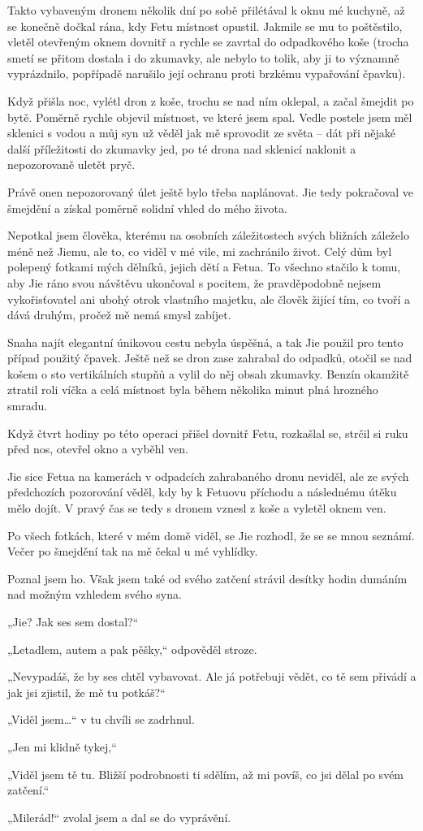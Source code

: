 Takto vybaveným dronem několik dní po sobě přilétával k oknu mé kuchyně, až se konečně dočkal rána, kdy Fetu místnost opustil. Jakmile se mu to poštěstilo, vletěl otevřeným oknem dovnitř a rychle se zavrtal do odpadkového koše (trocha smetí se přitom dostala i do zkumavky, ale nebylo to tolik, aby ji to významně vyprázdnilo, popřípadě narušilo její ochranu proti brzkému vypařování čpavku).

Když přišla noc, vylétl dron z koše, trochu se nad ním oklepal, a začal šmejdit po bytě. Poměrně rychle objevil místnost, ve které jsem spal. Vedle postele jsem měl sklenici s vodou a můj syn už věděl jak mě sprovodit ze světa – dát při nějaké další příležitosti do zkumavky jed, po té drona nad sklenicí naklonit a nepozorovaně uletět pryč.

Právě onen nepozorovaný úlet ještě bylo třeba naplánovat. Jie tedy pokračoval ve šmejdění a získal poměrně solidní vhled do mého života.

Nepotkal jsem člověka, kterému na osobních záležitostech svých bližních záleželo méně než Jiemu, ale to, co viděl v mé vile, mi zachránilo život. Celý dům byl polepený fotkami mých dělníků, jejich dětí a Fetua. To všechno stačilo k tomu, aby Jie ráno svou návštěvu ukončoval s pocitem, že pravděpodobně nejsem vykořisťovatel ani ubohý otrok vlastního majetku, ale člověk žijící tím, co tvoří a dává druhým, pročež mě nemá smysl zabíjet. 

Snaha najít elegantní únikovou cestu nebyla úspěšná, a tak Jie použil pro tento případ použitý čpavek. Ještě než se dron zase zahrabal do odpadků, otočil se nad košem o sto vertikálních stupňů a vylil do něj obsah zkumavky. Benzín okamžitě ztratil roli víčka a celá místnost byla během několika minut plná hrozného smradu.

Když čtvrt hodiny po této operaci přišel dovnitř Fetu, rozkašlal se, strčil si ruku před nos, otevřel okno a vyběhl ven.

Jie sice Fetua na kamerách v odpadcích zahrabaného dronu neviděl, ale ze svých předchozích pozorování věděl, kdy by k Fetuovu příchodu a následnému útěku mělo dojít. V pravý čas se tedy s dronem vznesl z koše a vyletěl oknem ven.

Po všech fotkách, které v mém domě viděl, se Jie rozhodl, že se se mnou seznámí. Večer po šmejdění tak na mě čekal u mé vyhlídky.

Poznal jsem ho. Však jsem také od svého zatčení strávil desítky hodin dumáním nad možným vzhledem svého syna.

„Jie? Jak ses sem dostal?“ 

„Letadlem, autem a pak pěšky,“ odpověděl stroze.

„Nevypadáš, že by ses chtěl vybavovat. Ale já potřebuji vědět, co tě sem přivádí a jak jsi zjistil, že mě tu potkáš?“

„Viděl jsem…“ v tu chvíli se zadrhnul.

„Jen mi klidně tykej,“

„Viděl jsem tě tu. Bližší podrobnosti ti sdělím, až mi povíš, co jsi dělal po svém zatčení.“

„Milerád!“ zvolal jsem a dal se do vyprávění.
